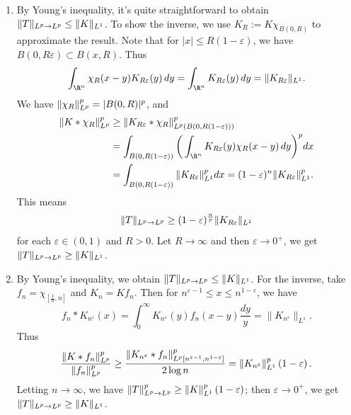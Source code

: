 \begin{enumerate}
\item[1.2.9.]
   By Young's inequality, it's quite straightforward to obtain 
   $\Vert T \Vert_{L^{p} \to L^{p}} \leq \Vert K \Vert_{L^{1}}$. 
   To show the inverse, we use $K_{R}:=K\chi_{B(0,R)}$ to approximate the result. 
   Note that for $|x| \leq R(1-\varepsilon)$, 
   we have $B(0,R\varepsilon) \subset B(x,R)$. Thus
   \[\int_{\R^{n}}\chi_{R}(x-y)K_{R\varepsilon}(y)\,dy
   =\int_{\R^{n}}K_{R\varepsilon}(y)\,dy=\norm{K_{R\varepsilon}}_{L^{1}}.\]
   We have $\Vert \chi_{R} \Vert_{L^{p}}^{p}=|B(0,R)|^{p}$, and
   \begin{equation*}\begin{aligned}
   \norm{K*\chi_{R}}_{L^{p}}^{p} 
   &\geq \norm{K_{R\varepsilon}*\chi_{R}}_{L^{p}(B(0,R(1-\varepsilon)))}^{p} \\
   &= \int_{B(0,R(1-\varepsilon))}
   \bigg(\int_{\R^{n}}K_{R\varepsilon}(y)\chi_{R}(x-y)\,dy\bigg)^{p}dx
   \\&= \int_{B(0,R(1-\varepsilon))}\norm{K_{R\varepsilon}}_{L^{1}}^{p}dx 
   = (1-\varepsilon)^{n}\norm{K_{R\varepsilon}}_{L^{1}}^{p}.
   \end{aligned}\end{equation*}
   This means \[\Vert T \Vert_{L^{p} \to L^{p}} 
   \geq (1-\varepsilon)^{\frac{n}{p}}\Vert K_{R\varepsilon} \Vert_{L^{1}}\]
   for each $\varepsilon \in (0,1)$ and $R>0$. 
   Let $R \to \infty$ and then $\varepsilon \to 0^{+}$, 
   we get $\Vert T \Vert_{L^{p} \to L^{p}} \geq \Vert K \Vert_{L^{1}}$.

\item[1.2.10.]
   By Young's inequality, we obtain 
   $\Vert T \Vert_{L^{p} \to L^{p}} \leq \Vert K \Vert_{L^{1}}$.
   For the inverse, take $f_{n}=\chi_{[\frac{1}{n},n]}$ and $K_{n}=Kf_{n}$. 
   Then for $ n^{\varepsilon -1}\le x\le n^{1-\varepsilon}$, we have
   \[
    f_n*K_{n^{\varepsilon}}( x ) 
    =\int_0^{\infty}{K_{n^{\varepsilon}}( y ) f_n( x-y ) \frac{dy}{y}}
    =\|K_{n^{\varepsilon}}\|_{L^1}.
   \]
   Thus
   \[
   \frac{\Vert K*f_{n} \Vert_{L^{p}}^{p}}{\Vert f_{n} \Vert_{L^{p}}^{p}} 
   \geq
   \frac{\Vert K_{n^{\varepsilon}}*f_n \Vert_{L^p\left[ n^{\varepsilon -1},n^{1-\varepsilon} \right]}^{p}}{2\log n}
   =\Vert K_{n^{\varepsilon}} \Vert_{L^1}^{p}\left( 1-\varepsilon \right). 
   \]
   Letting $ n\to \infty $, we have $ \Vert T \Vert_{L^{p} \to L^{p}}^{p}
   \ge \Vert K \Vert_{L^1}^{p}\left( 1-\varepsilon \right) $; 
   then $ \varepsilon \to 0^{+} $, we get 
   $ \Vert T \Vert_{L^{p} \to L^{p}} \ge \Vert K \Vert_{L^{1}} $.


\end{enumerate}
